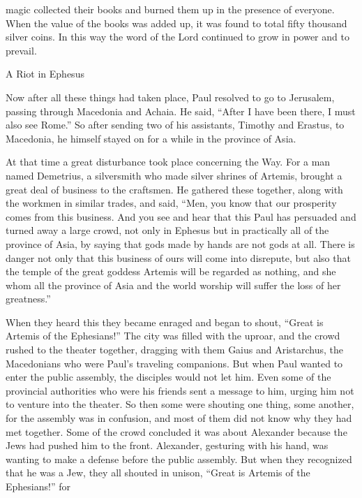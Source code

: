 {magic
collected
their books
and burned
them up
in the presence of
everyone.
When the value
of the books
was added up,
it was found
to total fifty thousand
silver coins.
In this way
the word
of the Lord
continued to grow
in
power
and
to prevail.
\par }{\SH A Riot in Ephesus
\par }{\PP {}Now after all these things
had taken place,
Paul
resolved
to go
to
Jerusalem,
passing through
Macedonia
and
Achaia.
He said, “After
I have been
there,
I
must
also
see
Rome.”
So
after sending
two
of his
assistants,
Timothy
and
Erastus,
to
Macedonia,
he
himself
stayed on
for a while
in
the province of Asia.
\par }{\PP {}At
that
time
a great
disturbance
took place
concerning
the Way.
For
a man
named
Demetrius,
a silversmith
who made
silver
shrines
of Artemis,
brought
a great deal
of business
to the craftsmen.
He gathered
these together,
along with the workmen
in similar trades,
and said,
“Men,
you know
that
our
prosperity
comes from
this
business.
And
you see
and
hear
that
this
Paul
has persuaded
and turned away
a large
crowd,
not
only
in Ephesus
but
in practically
all
of the province of Asia,
by saying
that
gods
made
by
hands
are
not gods at all.
There is danger
not
only
that this
business
of ours
will come
into
disrepute,
but
also
that the temple
of the great
goddess
Artemis
will
be regarded
as
nothing,
and
she
whom
all
the province of Asia
and
the world
worship
will suffer the loss
of her
greatness.”
\par }{\PP {}When
they heard
this they became
enraged
and began to shout, “Great
is Artemis
of the Ephesians!”
The city
was filled
with the uproar,
and the crowd rushed
to
the theater
together,
dragging
with them Gaius
and
Aristarchus,
the Macedonians
who were Paul’s
traveling companions.
But
when Paul
wanted
to enter
the public assembly,
the disciples
would
not
let
him.
Even
some
of the provincial authorities
who were
his
friends
sent a message
to
him,
urging
him
not
to venture
into
the theater.
So then
some
were shouting
one thing,
some another,
for
the assembly
was in confusion,
and
most
of them did not
know
why
they had met together.
Some of the crowd
concluded
it was about Alexander
because the Jews
had pushed
him
to the front. Alexander,
gesturing
with his hand,
was wanting
to make a defense
before the public assembly.
But
when
they recognized
that
he was
a Jew,
they all
shouted
in unison, “Great
is Artemis
of
the Ephesians!” for
}
